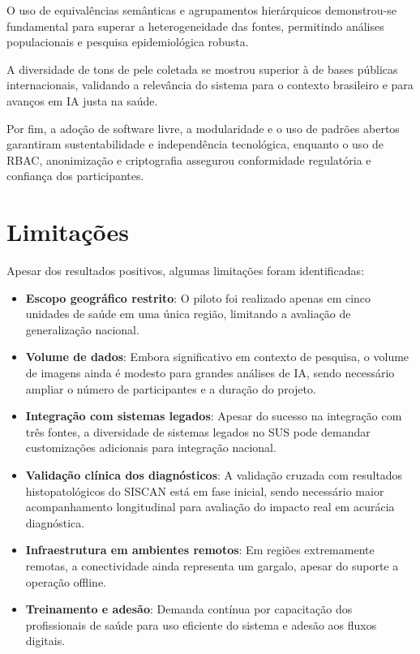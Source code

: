 O uso de equivalências semânticas e agrupamentos hierárquicos demonstrou-se fundamental para superar a heterogeneidade das fontes, permitindo análises populacionais e pesquisa epidemiológica robusta.

A diversidade de tons de pele coletada se mostrou superior à de bases públicas internacionais, validando a relevância do sistema para o contexto brasileiro e para avanços em IA justa na saúde.

Por fim, a adoção de software livre, a modularidade e o uso de padrões abertos garantiram sustentabilidade e independência tecnológica, enquanto o uso de RBAC, anonimização e criptografia assegurou conformidade regulatória e confiança dos participantes.

\section{Limitações}

Apesar dos resultados positivos, algumas limitações foram identificadas:

\begin{itemize}
    \item \textbf{Escopo geográfico restrito}: O piloto foi realizado apenas em cinco unidades de saúde em uma única região, limitando a avaliação de generalização nacional.
    \item \textbf{Volume de dados}: Embora significativo em contexto de pesquisa, o volume de imagens ainda é modesto para grandes análises de IA, sendo necessário ampliar o número de participantes e a duração do projeto.
    \item \textbf{Integração com sistemas legados}: Apesar do sucesso na integração com três fontes, a diversidade de sistemas legados no SUS pode demandar customizações adicionais para integração nacional.
    \item \textbf{Validação clínica dos diagnósticos}: A validação cruzada com resultados histopatológicos do SISCAN está em fase inicial, sendo necessário maior acompanhamento longitudinal para avaliação do impacto real em acurácia diagnóstica.
    \item \textbf{Infraestrutura em ambientes remotos}: Em regiões extremamente remotas, a conectividade ainda representa um gargalo, apesar do suporte a operação offline.
    \item \textbf{Treinamento e adesão}: Demanda contínua por capacitação dos profissionais de saúde para uso eficiente do sistema e adesão aos fluxos digitais.
\end{itemize}

